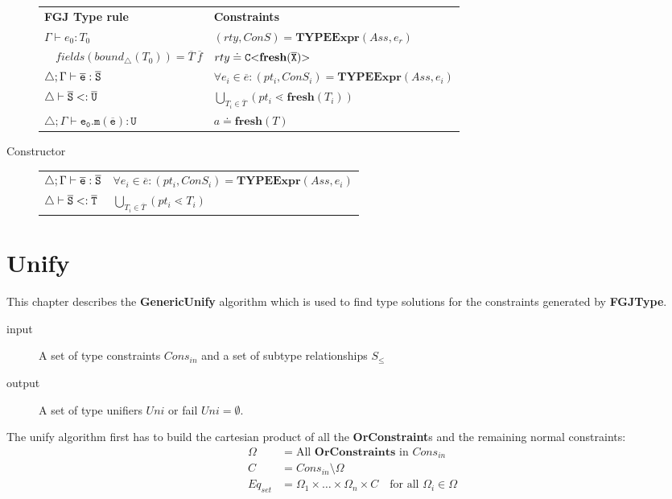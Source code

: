 \documentclass[runningheads]{llncs}
\begin{document}
\begin{description}
 \begin{tabular}{l|l}
   \textbf{FGJ Type rule} & \textbf{Constraints} \\
   $\Gamma \vdash e_0:T_0$ & $(rty, ConS) = \textbf{TYPEExpr}(Ass, e_r)$\\ 
   $\quad \mathit{fields}(\mathit{bound}_\triangle(T_0)) = \overline{T} \ \overline{f}$ & $rty \doteq \mathtt{C {\tt <} \textbf{fresh}(\overline{\tt X}) {\tt >} \ }$ \\
  $\triangle; \Gamma \vdash \overline{\tt e} : \overline{\tt S}$ & $\forall e_i \in \overline{e} : (pt_i, ConS_i) = \textbf{TYPEExpr}(Ass, e_i)$\\
  $\triangle \vdash \overline{\tt S} <: \overline{\tt U}$ & $ \bigcup_{T_i \in \overline{T}} (pt_i \lessdot \textbf{fresh}(T_i))$\\
  $\triangle; \Gamma \vdash \mathtt{e_0.m(\overline{e}) : U }$ & $a \doteq \textbf{fresh}(T)$ \\
 \end{tabular}
 \item[Constructor]

\begin{tabular}{l|l}
  $\triangle; \Gamma \vdash \overline{\tt e} : \overline{\tt S}$ & $\forall e_i \in \overline{e} : (pt_i, ConS_i) = \textbf{TYPEExpr}(Ass, e_i)$\\
  $\triangle \vdash \overline{\tt S} <: \overline{\tt T}$ & $\bigcup_{T_i \in \overline{T}} (pt_i \lessdot T_i)$
\end{tabular}
  
\end{description}

\section{Unify}
\label{sec:unify}
This chapter describes the \textbf{GenericUnify} algorithm
which is used to find type solutions for the constraints generated by \textbf{FGJType}.

\begin{description}
\item[input] A set of type constraints $Cons_{in}$ and a set of subtype relationships $S_\leq$
\item[output] A set of type unifiers $Uni$
or fail $Uni = \emptyset$.
\end{description}

The unify algorithm first has to build the cartesian product of all the \textbf{OrConstraint}s and the remaining normal constraints:
\begin{align*}
\Omega &= \text{All }\mathbf{OrConstraints} \text{ in } {Cons}_{in}\\
C &= {Cons}_{in} \setminus \Omega \\
Eq_{set} &= \Omega_1 \times \ldots \times \Omega_n \times C \quad \text{for all }\Omega_i \in \Omega
\end{align*}
\end{document}
